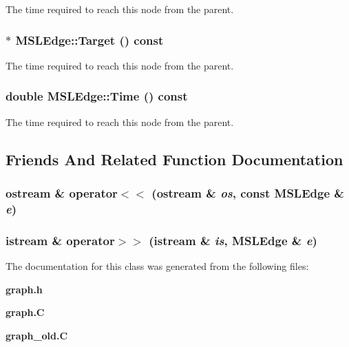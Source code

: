 The time required to reach this node from the parent.

\subsubsection{ $\ast$ MSLEdge::Target () const\hspace{0.3cm}{\tt  [inline]}}\label{classMSLEdge_a10}


The time required to reach this node from the parent.

\subsubsection{\setlength{\rightskip}{0pt plus 5cm}double MSLEdge::Time () const\hspace{0.3cm}{\tt  [inline]}}\label{classMSLEdge_a5}


The time required to reach this node from the parent.



\subsection{Friends And Related Function Documentation}
\subsubsection{\setlength{\rightskip}{0pt plus 5cm}ostream \& operator$<$$<$ (ostream \& {\em os}, const MSLEdge \& {\em e})\hspace{0.3cm}{\tt  [friend]}}\label{classMSLEdge_l1}


\subsubsection{\setlength{\rightskip}{0pt plus 5cm}istream \& operator$>$$>$ (istream \& {\em is}, MSLEdge \& {\em e})\hspace{0.3cm}{\tt  [friend]}}\label{classMSLEdge_l0}




The documentation for this class was generated from the following files:\begin{CompactItemize}
\item 
{\bf graph.h}\item 
{\bf graph.C}\item 
{\bf graph\_\-old.C}\end{CompactItemize}

